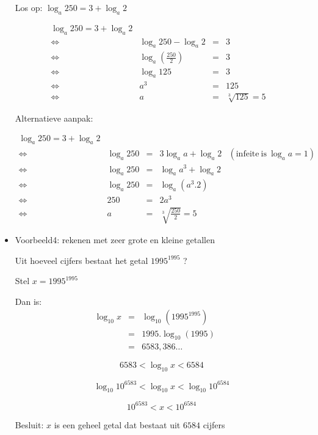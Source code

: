 \begin{itemize}
Los op: ${\displaystyle \log_{a}250=3+\log_{a}2}$

\[
{\displaystyle \begin{split}{\displaystyle \log_{a}250=3+\log_{a}2}\\
	\Longleftrightarrow & {\displaystyle \log_{a}250-\log_{a}2} & = & 3\\
	\Longleftrightarrow & {\displaystyle \log_{a}\left(\frac{250}{2}\right)} & = & 3 & \text{}\\
	\Longleftrightarrow & {\displaystyle \log_{a}125} & = & 3\\
	\Longleftrightarrow & a^{3} & = & 125\\
	\Longleftrightarrow & a & = & \sqrt[3]{125}=5
	\end{split}
}
\]


Alternatieve aanpak:

\[
{\displaystyle \begin{split}{\displaystyle \log_{a}250=3+\log_{a}2}\\
	\Longleftrightarrow & {\displaystyle \log_{a}250} & = & 3\log_{a}a+\log_{a}2 & (\textrm{infeite}\:\textrm{is}\:\log_{a}a=1)\\
	\Longleftrightarrow & {\displaystyle \log_{a}250} & = & \log_{a}a^{3}+\log_{a}2 & \text{}\\
	\Longleftrightarrow & {\displaystyle \log_{a}250} & = & \log_{a}\left(a^{3}.2\right)\\
	\Longleftrightarrow & 250 & = & 2a^{3}\\
	\Longleftrightarrow & a & = & \sqrt[3]{\frac{250}{2}}=5
	\end{split}
}
\]



\item{Voorbeeld4: rekenen met zeer grote en kleine getallen}

Uit hoeveel cijfers bestaat het getal ${\displaystyle 1995^{1995}}$
?

Stel ${\displaystyle x=1995^{1995}}$ 

Dan is: 
\[
{\displaystyle \begin{split}\log_{10}x & = & \log_{10}\left(1995^{1995}\right)\\
	& = & 1995.\log_{10}\left(1995\right)\\
	& = & 6583,386\ldots &  & \text{}
	\end{split}
}
\]


\[
{\displaystyle 6583<\log_{10}x<6584}
\]


\[
{\displaystyle \log_{10}10^{6583}<\log_{10}x<\log_{10}10^{6584}}
\]


\[
{\displaystyle 10^{6583}<x<10^{6584}}
\]


Besluit: $x$ is een geheel getal dat bestaat uit $6584$ cijfers

\end{itemize}



